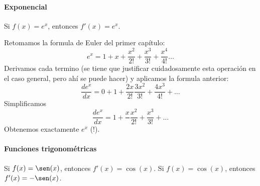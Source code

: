 \documentclass[12pt, a4paper]{article}
\theoremstyle{rioplatense}
\begin{document}
\paragraph{Exponencial} Si $f(x) = e^x$, entonces $f'(x) = e^x$.

Retomamos la formula de Euler del primer cap\'itulo:
\[
e^x =  1 + x + \frac{x^2}{2!} + \frac{x^3}{3!}  + 
\frac{x^4}{4!}
\dots
\]
Derivamos cada termino (se tiene que justificar cuidadosamente esta operaci\'on en el caso general, pero ah\'i se puede hacer) y aplicamos la formula anterior:
\[
\frac{de^x}{dx} =  0 + 1 + \frac{2x}{2!} 
\frac{3x^2}{3!}  + 
\frac{4x^3}{4!} + \dots
\]
Simplificamos
\[
\frac{de^x}{dx} =  1 + \frac{x}{} 
\frac{x^2}{2!}  + 
\frac{x^3}{3!} + \dots
\]
Obtenemos exactamente $e^x$ (!).


\paragraph{Funciones trigonom\'etricas}  Si $f(x) = \sen(x)$, entonces $f'(x) = \cos(x)$.
 Si $f(x) = \cos(x)$, entonces $f'(x) = -\sen(x)$.
 
\end{document}

